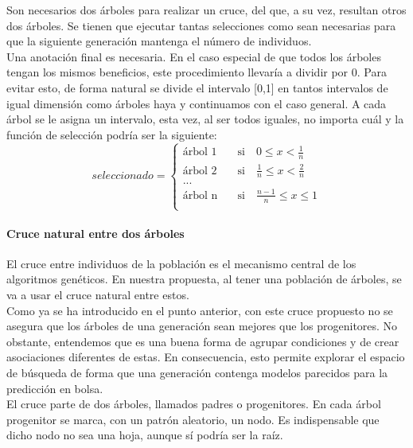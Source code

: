 Son necesarios dos \'arboles para realizar un cruce, del que, a su vez, resultan otros dos \'arboles. Se tienen que ejecutar tantas selecciones como sean necesarias para que la siguiente generaci\'on mantenga el n\'umero de individuos.\\

Una anotaci\'on final es necesaria. En el caso especial de que todos los \'arboles tengan los mismos beneficios, este procedimiento llevar\'ia a dividir por 0. Para evitar esto, de forma natural se divide el intervalo [0,1] en tantos intervalos de igual dimensi\'on como \'arboles haya y continuamos con el caso general. A cada \'arbol se le asigna un intervalo, esta vez, al ser todos iguales, no importa cu\'al y la funci\'on de selecci\'on podr\'ia ser la siguiente:\\

\[   
seleccionado = 
\begin{cases}
\text{\'arbol 1} &\quad\text{si}\quad 0 \leq x < \frac{1}{n}\\
\text{\'arbol 2} &\quad\text{si}\quad \frac{1}{n} \leq x < \frac{2}{n}\\
\text{...} \\
\text{\'arbol n} &\quad\text{si}\quad \frac{n-1}{n} \leq x \leq 1\\ 
\end{cases}
\]



\paragraph{Cruce natural entre dos \'arboles}\label{sec:cruce}
El cruce entre individuos de la poblaci\'on es el mecanismo central de los algoritmos gen\'eticos. En nuestra propuesta, al tener una poblaci\'on de \'arboles, se va a usar el cruce natural entre estos. \\

Como ya se ha introducido en el punto anterior, con este cruce propuesto no se asegura que los \'arboles de una generaci\'on sean mejores que los progenitores. No obstante, entendemos que es una buena forma de agrupar condiciones y de crear asociaciones diferentes de estas. En consecuencia, esto permite explorar el espacio de b\'usqueda de forma que una generaci\'on contenga modelos parecidos para la predicci\'on en bolsa.\\


El cruce parte de dos \'arboles, llamados padres o progenitores. En cada \'arbol progenitor se marca, con un patr\'on aleatorio, un nodo. Es indispensable que dicho nodo no sea una hoja, aunque s\'i podr\'ia ser la ra\'iz. \\

